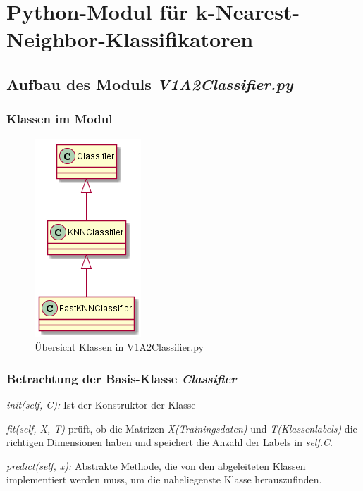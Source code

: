 \section{Python-Modul für k-Nearest-Neighbor-Klassifikatoren}


\subsection{Aufbau des Moduls \textit{V1A2\textunderscore Classifier.py}}


\subsubsection{Klassen im Modul}

\begin{figure}[H]
    \centering
    \includegraphics[width=0.3\linewidth]{files/classifier.png}
    \caption{Übersicht Klassen in V1A2\textunderscore Classifier.py}
\end{figure}


\subsubsection{Betrachtung der Basis-Klasse \textit{Classifier}}

\textit{\textunderscore\textunderscore init\textunderscore\textunderscore(self, C):} Ist der Konstruktor der Klasse

\noindent
\textit{fit(self, X, T)} prüft, ob die Matrizen \textit{X(Trainingsdaten)} und \textit{T(Klassenlabels)} die richtigen Dimensionen haben und speichert die Anzahl der Labels in \textit{self.C}.

\noindent
\textit{predict(self, x):} Abstrakte Methode, die von den abgeleiteten Klassen implementiert werden muss, um die naheliegenste Klasse herauszufinden.

